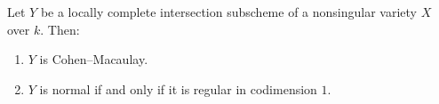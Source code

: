 Let $Y$ be a locally complete intersection subscheme of a nonsingular variety $X$ over $k$. Then:

\begin{enumerate}
\item[(a)] $Y$ is Cohen--Macaulay.
\item[(b)] $Y$ is normal if and only if it is regular in codimension $1$.
\end{enumerate}
